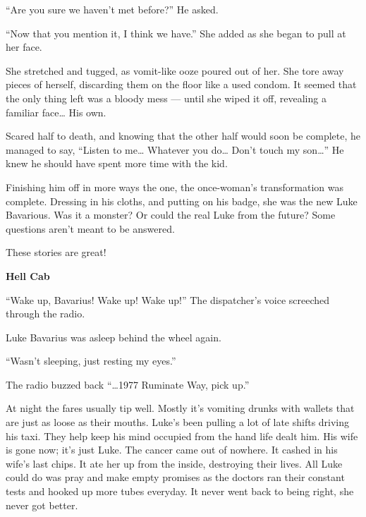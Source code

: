 ``Are you sure we haven't met before?'' He
asked.



``Now that you mention it, I think we have.'' She added
as she began to pull at her face.



She stretched and tugged, as vomit-like ooze poured out of her. She
tore away pieces of herself, discarding them on the floor like a
used condom. It seemed that the only thing left was a bloody mess
--- until she wiped it off, revealing a familiar face{\ldots}
His own.



Scared half to death, and knowing that the other half would soon be
complete, he managed to say, ``Listen to me{\ldots} Whatever
you do{\ldots} Don't touch my son{\ldots}'' He knew he
should have spent more time with the kid.



Finishing him off in more ways the one, the once-woman's
transformation was complete. Dressing in his cloths, and putting on
his badge, she was the new Luke Bavarious. Was it a monster? Or
could the real Luke from the future? Some questions aren't
meant to be answered. 
 





These stories are great!



{\bf Hell Cab}



``Wake up, Bavarius! Wake up! Wake up!'' The
dispatcher's voice screeched through the radio.



Luke Bavarius was asleep behind the wheel again.



``Wasn't sleeping, just resting my eyes.''

The radio buzzed back ``{\ldots}1977 Ruminate Way, pick
up.''



At night the fares usually tip well. Mostly it's vomiting
drunks with wallets that are just as loose as their mouths.
Luke's been pulling a lot of late shifts driving his taxi.
They help keep his mind occupied from the hand life dealt him. His
wife is gone now; it's just Luke. The cancer came out of
nowhere. It cashed in his wife's last chips. It ate her up
from the inside, destroying their lives. All Luke could do was pray
and make empty promises as the doctors ran their constant tests and
hooked up more tubes everyday. It never went back to being right,
she never got better.



